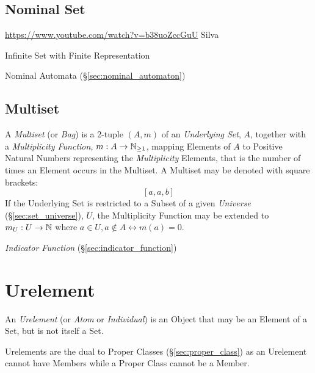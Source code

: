\subsection{Nominal Set}\label{sec:nominal_set}

\url{https://www.youtube.com/watch?v=b38uoZccGuU} Silva

Infinite Set with Finite Representation

Nominal Automata (\S\ref{sec:nominal_automaton})



\subsection{Multiset}\label{sec:multiset}

A \emph{Multiset} (or \emph{Bag}) is a 2-tuple $(A,m)$ of an
\emph{Underlying Set}, $A$, together with a \emph{Multiplicity
  Function}, $m : A \rightarrow \mathbb{N}_{\geq 1}$, mapping Elements
of $A$ to Positive Natural Numbers representing the
\emph{Multiplicity} Elements, that is the number of times an Element
occurs in the Multiset. A Multiset may be denoted with square
brackets:
\[
  [a,a,b]
\]
If the Underlying Set is restricted to a Subset of a given
\emph{Universe} (\S\ref{sec:set_universe}), $U$, the Multiplicity
Function may be extended to $m_U : U \rightarrow \mathbb{N}$ where $a \in
U, a \notin A \leftrightarrow m(a)=0$.

\emph{Indicator Function} (\S\ref{sec:indicator_function})



\section{Urelement}\label{sec:urelement}

An \emph{Urelement} (or \emph{Atom} or \emph{Individual}) is an Object
that may be an Element of a Set, but is not itself a Set.

Urelements are the dual to Proper Classes (\S\ref{sec:proper_class})
as an Urelement cannot have Members while a Proper Class cannot be a
Member.

